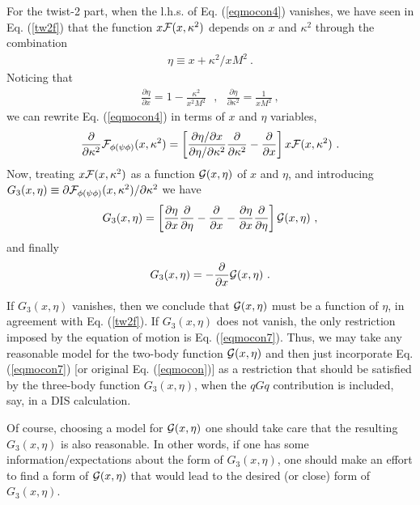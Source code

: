 \documentclass[final,5p,times,twocolumn]{elsarticle}
\begin{document}
For the twist-2 part,  when the l.h.s. of Eq. (\ref{eqmocon4}) vanishes, 
 we have seen in Eq. (\ref{tw2f}) that 
the function $x  {\cal F} (x, \kappa^2) $  depends 
 on $x$ and $\kappa^2$ through the combination 
    \begin{align}
 \eta \equiv x +\kappa^2 /xM^2 \  .
 \end{align} 
 Noticing  that 
    \begin{align}
     \frac{\partial \eta}{\partial x} =1-\frac{\kappa^2}{x^2 M^2}
      \  \  \ , \  \ \
\frac{\partial \eta}{\partial \kappa^2} = \frac1{xM^2}
  \  , 
 \end{align} 
we can rewrite Eq. (\ref{eqmocon4})  in terms of $x$ and $\eta$ variables, 
  \begin{align}
 \frac{\partial}{\partial \kappa^2}  {\cal F}_{\phi (\psi \phi) }(x, \kappa^2) =  \left [\frac{\partial \eta/\partial x}{\partial \eta/\partial \kappa^2}  \frac{\partial}{\partial \kappa^2} 
 -  \frac{\partial}{\partial x} \right ]  x  {\cal F} (x, \kappa^2)
 \  . 
 \label{eqmocon5}
\end{align}
Now, treating  $x  {\cal F} (x, \kappa^2) $ as a function
 ${\cal G} (x, \eta)$  of $x$  and $\eta$, and introducing $G_3 (x,\eta) 
 \equiv \partial {\cal F}_{\phi (\psi \phi)}(x, \kappa^2) /\partial \kappa^2 $
 we have 
  \begin{align}
 G_3 (x,\eta) = 
 \left [\frac{\partial \eta}{\partial x}   \frac{\partial}{\partial \eta} 
 -  \frac{\partial}{\partial x} - \frac{\partial \eta}{\partial x}  
  \frac{\partial}{\partial \eta} \right ]  {\cal G} (x, \eta) \ , 
 \label{eqmocon6}
\end{align}
and finally 
  \begin{align}
 G_3 (x,\eta) =  -  \frac{\partial}{\partial x}  {\cal G} (x, \eta)
\ . 
 \label{eqmocon7}
\end{align}

If   $ G_3 (x,\eta)$ vanishes, then we conclude that $ {\cal G} (x, \eta)$
must be a function of $\eta$, in agreement with Eq. (\ref{tw2f}).   
If  ${ G}_3 (x, \eta)$ does  not vanish, 
the only restriction imposed by the  equation  of motion  is Eq. (\ref{eqmocon7}).
Thus, we may 
take   any  reasonable model for the two-body function
${\cal G} (x, \eta)$  and then just  incorporate    Eq. (\ref{eqmocon7})  [or original Eq. (\ref{eqmocon})]
as a restriction that should be satisfied by the three-body function
$G_3 (x,\eta) $, when the $qGq$  contribution is included, say, in a DIS calculation. 

Of course, choosing a model for  ${\cal G} (x, \eta)$  one should take care that
the resulting $ G_3 (x,\eta)$ is also reasonable. In other words,
if one has some  information/expectations  about the form of 
 $ G_3 (x,\eta)$, one should make an effort to find 
 a form of  ${\cal G} (x, \eta)$ that would lead to the desired (or close) form
 of   $ G_3 (x,\eta)$. 
 
\end{document}
